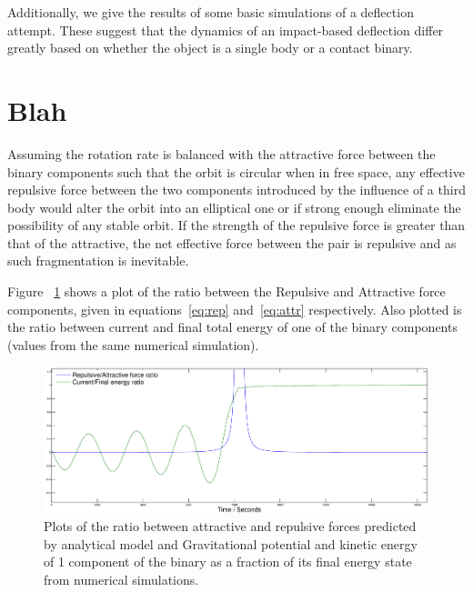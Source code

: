 \documentclass[letterpaper, preprint, paper,11pt]{AAS}	%
\begin{document}
Additionally, we give the results of some basic simulations of a deflection attempt. These suggest that the dynamics of an impact-based deflection differ greatly based on whether the object is a single body or a contact binary. 


\section{Blah}


Assuming the rotation rate is balanced with the attractive force between the binary components such that the orbit is circular when in free space, any effective repulsive force between the two components introduced by the influence of a third body would alter the orbit into an elliptical one or if strong enough eliminate the possibility of any stable orbit. If the strength of the repulsive force is greater than that of the attractive, the net effective force between the pair is repulsive and as such fragmentation is inevitable. 

Figure ~\ref{fig:Analy} shows a plot of the ratio between the Repulsive and Attractive force components, given in equations~\ref{eq:rep} and~\ref{eq:attr} respectively. Also plotted is the ratio between current and final total energy of one of the binary components (values from the same numerical simulation). 
\begin{figure}[H]
\centering
\centerline{\includegraphics[width=1.2\textwidth]{binary_analy.eps}} 
\caption{Plots of the ratio between attractive and repulsive forces predicted by analytical model and Gravitational potential and kinetic energy of 1 component of the binary as a fraction of its final energy state from numerical simulations.} 
\label{fig:Analy}
\end{figure} 
\end{document}
